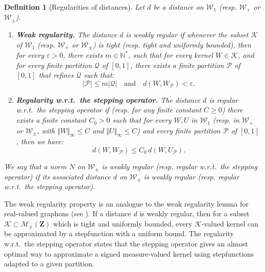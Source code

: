\documentclass{amsart}
\newcommand{\wrt}{w.r.t.\ }
\theoremstyle{plain}
\newtheorem{defi}[Th]{Definition}
\theoremstyle{definition}
\newcommand{\Space}{\mathbf{Z}}
\newcommand{\signed}{\pm}
\newcommand{\ck}{\mathcal{K}}
\newcommand{\cp}{\mathcal{P}}
\newcommand{\SignedMeas}{\mathcal{M}_{\pm}(\Space)}
\newcommand{\Graphon}{\mathcal{W}_1}
\newcommand{\Kernel}{\mathcal{W}_{\signed}}
\newcommand{\Kernelp}{\mathcal{W}_{+}}
\newcommand{\TM}[1]{\norm{#1}_\infty}
\newcommand{\N}{\mathbb{N}}
\newcommand{\norm}[1]{\Vert#1\Vert}
\newcommand{\eps}{\varepsilon}
\begin{document}
\begin{defi}[Regularities of distances]
  \label{defi:extra-prop}
Let $d$ be a distance  on $\Graphon$ (resp. $\Kernelp$ or $\Kernel$). 
\begin{enumerate}[label=(\roman*)]


\item\label{hypo_dist_WRL}  \textbf{Weak  regularity.} The distance
  $d$ is weakly  regular
  if  whenever  the
  subset  $\ck$ of $ \Graphon$  (resp. $\Kernelp$ or  $\Kernel$) is  tight (resp. tight and
  uniformly bounded),  then  for  every
  $\eps   >  0$,   there  exists   $m\in\N^*$,  such   that  for   every
   kernel    $W\in\ck$,  and  for   every  finite
  partition $\mathcal{Q}$  of $[0,1]$,  there exists a  finite partition
  $\mathcal{P}$  of   $[0,1]$  that  refines  $\mathcal{Q}$   such
  that:
  \[
    \vert\mathcal{P}\vert  \leq m  \vert\mathcal{Q}\vert
    \quad\text{and}\quad
    d(W, W_{\mathcal{P}}) < \eps.
  \]

  
\item\label{hypo_dist_stepping_optimal} \textbf{Regularity \wrt the
    stepping  operator.} The distance
  $d$ is regular \wrt the
    stepping  operator if
 (resp. for any finite  constant $C\geq 0$) there exists a finite constant $C_0>0$ 
  such  that for every $W, U$ in
  $\Graphon$ (resp. in $\Kernelp$ or $\Kernel$, with  $\TM{W}\leq  C$ and
  $\TM{U}\leq C$) and
  every finite partition $\cp$ of $[0, 1]$, then we have:
\begin{equation}
   \label{eq:opt-step}
    d(W,W_\cp) \leq C_0\,  d(W,U_\cp).
\end{equation}
\end{enumerate}
We say that a norm $N$ on $\Kernel$ is weakly regular (resp. regular \wrt the
    stepping  operator)
if its associated distance $d$ on $\Kernel$ is weakly regular (resp. regular \wrt the
    stepping  operator).
\end{defi}

The weak regularity property is an analogue to the weak regularity lemma for
real-valued graphons (see  \cite[Lemma~9.15]{Lovasz}).
If a distance $d$ is weakly regular, then for a subset $\ck \subset \SignedMeas$
which is tight and uniformly bounded, every $\ck$-valued kernel
can be approximated by a stepfunction with a uniform bound.
The regularity \wrt the stepping  operator states that the 
stepping operator gives an almost optimal way to approximate a signed measure-valued kernel
using stepfunctions adapted to a given partition.
\end{document}

